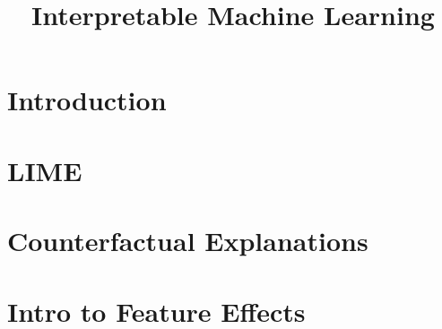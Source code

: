 \documentclass[11pt,compress,t,notes=noshow, aspectratio=169, xcolor=table]{beamer}
\title{Interpretable Machine Learning}
\date{}
\begin{document}

\section{Introduction}

% 

% 

%

%


\section{LIME}






\section{Counterfactual Explanations}

%



\section{Intro to Feature Effects}





\end{document}
